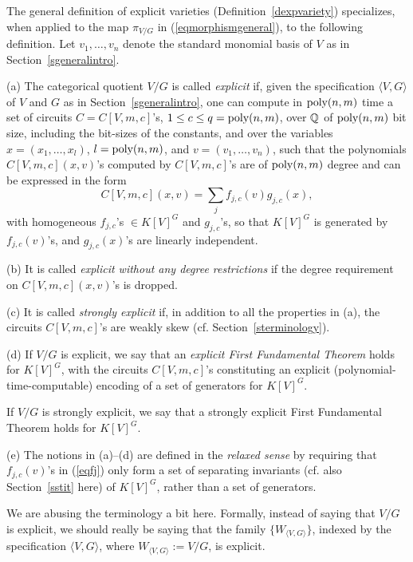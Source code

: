 \documentclass[11pt]{article}
\begin{document}
The general definition of explicit varieties (Definition~\ref{dexpvariety}) 
specializes, when applied to the map $\pi_{V/G}$ in (\ref{eqmorphismgeneral}),  to the following definition.
Let $v_1,\ldots,v_n$ denote the standard monomial basis \cite{raghavan}  of $V$ as in Section~\ref{sgeneralintro}.


\begin{defn} \label{dexpffthilbert}
\noindent (a) The categorical quotient   $V/G$ is  called {\em explicit}  if,
given the specification $\langle V, G \rangle$ of $V$ and $G$ as in Section~\ref{sgeneralintro},
one can compute in ${\mbox {poly}}(n,m)$ time a set of  circuits
$C=C[V,m,c]$'s, $1 \le c \le q={\mbox {poly}}(n,m)$,   over $\mathbb{Q}$ of ${\mbox {poly}}(n,m)$ bit size, including the bit-sizes of the constants, and over 
the variables $x=(x_1,\ldots,x_l)$, $l={\mbox {poly}}(n,m)$,  and $v=(v_1,\ldots,v_n)$, such that 
the polynomials $C[V,m,c](x,v)$'s  computed by  $C[V,m,c]$'s are of ${\mbox {poly}}(n,m)$ degree and can be expressed  in the form 
\begin{equation} \label{eqfj}  C[V,m,c](x,v)=\sum_j f_{j,c}(v) g_{j,c}(x), \end{equation}
with homogeneous $f_{j,c}$'s $\in K[V]^G$ and $g_{j,c}$'s, 
so that $K[V]^G$ is  generated by  $f_{j,c}(v)$'s,  and $g_{j,c}(x)$'s are linearly independent.

\noindent (b) It is called {\em explicit without any degree restrictions}
if the degree requirement on $C[V,m,c](x,v)$'s is dropped.


\noindent (c) It  is called {\em strongly explicit} if, in addition to all the properties in (a), 
 the circuits $C[V,m,c]$'s are weakly skew (cf. Section~\ref{sterminology}).

\noindent (d) If $V/G$ is explicit, we  say that an {\em explicit First Fundamental Theorem} holds for 
$K[V]^G$, with the circuits $C[V,m,c]$'s constituting an
explicit (polynomial-time-computable)  encoding of a set of  generators for $K[V]^G$.

If $V/G$ is strongly explicit, we  say that a strongly explicit First Fundamental Theorem holds for
$K[V]^G$. 

\noindent (e) The notions in (a)--(d) are defined in the {\em relaxed sense} 
by requiring that  $f_{j,c}(v)$'s in (\ref{eqfj})
only  form a set of separating 
invariants \cite{derksenbook} (cf. also  Section~\ref{sstit} here) of $K[V]^G$, rather than
a set of generators.
\end{defn}


We are abusing the terminology a bit here.
Formally, instead of saying that $V/G$ is explicit, we should really be saying that the family 
$\{W_{\langle V, G \rangle}\}$, indexed by the specification $\langle V, G \rangle$,
where $W_{\langle V, G \rangle}:=V/G$, is explicit.
\end{document}
